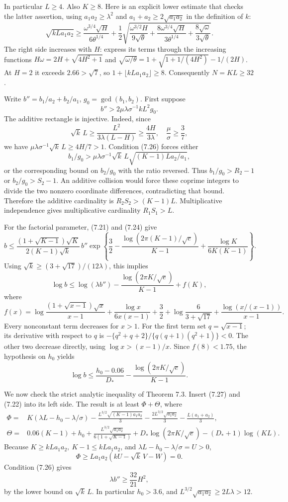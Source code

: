 \documentclass[
  11pt,
  a4paper,
]{article}
\begin{document}
In particular \(L\ge4\). Also \(K\ge8\). Here is an explicit lower
estimate that checks the latter assertion, using \(a_1a_2\ge\lambda^2\)
and \(a_1+a_2\ge2\sqrt{a_1a_2}\) in the definition of \(k\): \[
\sqrt{kLa_1a_2}\ge
\frac{\omega^{3/4}\sqrt H}{6\theta^{1/4}}
+\frac12\sqrt{
\frac{\omega^{3/2}H}{9\sqrt\theta}
+\frac{8\omega^{3/4}\sqrt H}{3\theta^{1/4}}
+\frac{8\sqrt\omega}{3\sqrt\theta}}.
\] The right side increases with \(H\): express its terms through the
increasing functions \(H\omega=2H+\sqrt{4H^2+1}\) and
\(\sqrt{\omega/\theta}=1+\sqrt{1+1/(4H^2)}-1/(2H)\). At \(H=2\) it
exceeds \(2.66>\sqrt7\), so \(1+\lfloor kLa_1a_2\rfloor\ge8\).
Consequently \(N=KL\ge32\).

Write \(b''=b_1/a_2+b_2/a_1\), \(g_0=\gcd(b_1,b_2)\). First suppose \[
b''>2\mu\lambda\sigma^{-1}kL^2g_0. \tag{7.26}
\] The additive rectangle is injective. Indeed, since \[
\sqrt k\,L\ge\frac{L^2}{3\lambda(L-H)}\ge\frac{4H}{3\lambda},
\quad \frac{\mu}{\sigma}\ge\frac37,
\] we have \(\mu\lambda\sigma^{-1}\sqrt k\,L\ge4H/7>1\). Condition
(7.26) forces either \[
b_1/g_0>\mu\lambda\sigma^{-1}\sqrt k\,L
\sqrt{(K-1)La_2/a_1},
\] or the corresponding bound on \(b_2/g_0\) with the ratio reversed.
Thus \(b_1/g_0>R_2-1\) or \(b_2/g_0>S_2-1\). An additive collision would
force these coprime integers to divide the two nonzero coordinate
differences, contradicting that bound. Therefore the additive
cardinality is \(R_2S_2>(K-1)L\). Multiplicative independence gives
multiplicative cardinality \(R_1S_1>L\).

For the factorial parameter, (7.21) and (7.24) give \[
b\le
\frac{(1+\sqrt{K-1})\sqrt K}{2(K-1)\sqrt k}\,
b''\exp\left\{\frac32-
\frac{\log(2\pi(K-1)/\sqrt e)}{K-1}
+\frac{\log K}{6K(K-1)}\right\}.
\] Using \(\sqrt k\ge(3+\sqrt{17})/(12\lambda)\), this implies \[
\log b\le\log(\lambda b'')-
\frac{\log(2\pi K/\sqrt e)}{K-1}+f(K),
\] where \[
f(x)=\log\frac{(1+\sqrt{x-1})\sqrt x}{x-1}
+\frac{\log x}{6x(x-1)}+\frac32
+\log\frac6{3+\sqrt{17}}
+\frac{\log(x/(x-1))}{x-1}.
\] Every nonconstant term decreases for \(x>1\). For the first term set
\(q=\sqrt{x-1}\); its derivative with respect to \(q\) is
\(-\{q^2+q+2\}/\{q(q+1)(q^2+1)\}<0\). The other two decrease directly,
using \(\log x>(x-1)/x\). Since \(f(8)<1.75\), the hypothesis on \(h_0\)
yields \[
\log b\le\frac{h_0-0.06}{D_*}
-\frac{\log(2\pi K/\sqrt e)}{K-1}. \tag{7.27}
\]

We now check the strict analytic inequality of Theorem 7.3. Insert
(7.27) and (7.22) into its left side. The result is at least
\(\Phi+\Theta\), where \[
\begin{aligned}
\Phi={}&K(\lambda L-h_0-\lambda/\sigma)
-\frac{L^{3/2}\sqrt{(K-1)a_1a_2}}3
-\frac{2L^{3/2}\sqrt{a_1a_2}}3-\frac{L(a_1+a_2)}3,\\
\Theta={}&0.06(K-1)+h_0+
\frac{L^{3/2}\sqrt{a_1a_2}}{6(1+\sqrt{K-1})}
+D_*\log(2\pi K/\sqrt e)-(D_*+1)\log(KL).
\end{aligned}
\] Because \(K\ge kLa_1a_2,\ K-1\le kLa_1a_2\), and
\(\lambda L-h_0-\lambda/\sigma=U>0\), \[
\Phi\ge La_1a_2(kU-\sqrt k\,V-W)=0.
\] Condition (7.26) gives \[
\lambda b''\ge\frac{32}{21}H^2,
\] by the lower bound on \(\sqrt k\,L\). In particular \(h_0>3.6\), and
\(L^{3/2}\sqrt{a_1a_2}\ge2L\lambda>12\).
\end{document}
